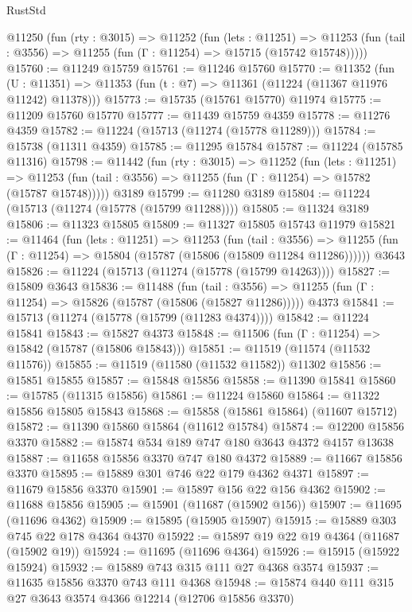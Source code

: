 \begin{lexlean}{RustStd}
\begin{coremodule}
  @11250
    (fun (rty : @3015) =>
    @11252
      (fun (lets : @11251) =>
      @11253 (fun (tail : @3556) => @11255 (fun (Γ : @11254) => @15715 (@15742 @15748)))))
@15760 := @11249 @15759
@15761 := @11246 @15760
@15770 := @11352
    (fun (U : @11351) => @11353 (fun (t : @7) => @11361 (@11224 (@11367 @11976 @11242) @11378)))
@15773 := @15735 (@15761 @15770) @11974
@15775 := @11209 @15760 @15770
@15777 := @11439 @15759 @4359
@15778 := @11276 @4359
@15782 := @11224 (@15713 (@11274 (@15778 @11289)))
@15784 := @15738 (@11311 @4359)
@15785 := @11295 @15784
@15787 := @11224 (@15785 @11316)
@15798 := @11442
    (fun (rty : @3015) =>
    @11252
      (fun (lets : @11251) =>
      @11253 (fun (tail : @3556) => @11255 (fun (Γ : @11254) => @15782 (@15787 @15748)))))
    @3189
@15799 := @11280 @3189
@15804 := @11224 (@15713 (@11274 (@15778 (@15799 @11288))))
@15805 := @11324 @3189
@15806 := @11323 @15805
@15809 := @11327 @15805 @15743 @11979
@15821 := @11464
    (fun (lets : @11251) =>
    @11253
      (fun (tail : @3556) =>
      @11255 (fun (Γ : @11254) => @15804 (@15787 (@15806 (@15809 @11284 @11286))))))
    @3643
@15826 := @11224 (@15713 (@11274 (@15778 (@15799 @14263))))
@15827 := @15809 @3643
@15836 := @11488
    (fun (tail : @3556) => @11255 (fun (Γ : @11254) => @15826 (@15787 (@15806 (@15827 @11286)))))
    @4373
@15841 := @15713 (@11274 (@15778 (@15799 (@11283 @4374))))
@15842 := @11224 @15841
@15843 := @15827 @4373
@15848 := @11506 (fun (Γ : @11254) => @15842 (@15787 (@15806 @15843)))
@15851 := @11519 (@11574 (@11532 @11576))
@15855 := @11519 (@11580 (@11532 @11582)) @11302
@15856 := @15851 @15855
@15857 := @15848 @15856
@15858 := @11390 @15841
@15860 := @15785 (@11315 @15856)
@15861 := @11224 @15860
@15864 := @11322 @15856 @15805 @15843
@15868 := @15858 (@15861 @15864) (@11607 @15712)
@15872 := @11390 @15860 @15864 (@11612 @15784)
@15874 := @12200 @15856 @3370
@15882 := @15874 @534 @189 @747 @180 @3643 @4372 @4157 @13638
@15887 := @11658 @15856 @3370 @747 @180 @4372
@15889 := @11667 @15856 @3370
@15895 := @15889 @301 @746 @22 @179 @4362 @4371
@15897 := @11679 @15856 @3370
@15901 := @15897 @156 @22 @156 @4362
@15902 := @11688 @15856
@15905 := @15901 (@11687 (@15902 @156))
@15907 := @11695 (@11696 @4362)
@15909 := @15895 (@15905 @15907)
@15915 := @15889 @303 @745 @22 @178 @4364 @4370
@15922 := @15897 @19 @22 @19 @4364 (@11687 (@15902 @19))
@15924 := @11695 (@11696 @4364)
@15926 := @15915 (@15922 @15924)
@15932 := @15889 @743 @315 @111 @27 @4368 @3574
@15937 := @11635 @15856 @3370 @743 @111 @4368
@15948 := @15874 @440 @111 @315 @27 @3643 @3574 @4366 @12214 (@12706 @15856 @3370)

\end{coremodule}
\end{lexlean}
